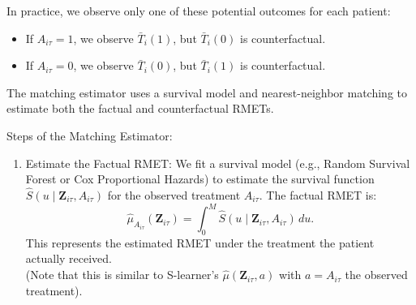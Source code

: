 In practice, we observe only one of these potential outcomes for each patient:
\begin{itemize}
    \item If $ A_{i\tau} = 1 $, we observe $ \bar{T}_i(1) $, but $ \bar{T}_i(0) $ is counterfactual.
    \item If $ A_{i\tau} = 0 $, we observe $ \bar{T}_i(0) $, but $ \bar{T}_i(1) $ is counterfactual.
\end{itemize}

The matching estimator uses a survival model and nearest-neighbor matching to estimate both the factual and counterfactual RMETs.

Steps of the Matching Estimator:
\begin{enumerate}
\item Estimate the Factual RMET:
   We fit a survival model (e.g., Random Survival Forest or Cox Proportional Hazards) to estimate the survival function $ \widehat{S}(u \mid \mathbf{Z}_{i\tau}, A_{i\tau}) $ for the observed treatment $ A_{i\tau} $.
The factual RMET is:
   $$ \widehat{\mu}_{A_{i\tau}}(\mathbf{Z}_{i\tau}) = \int_{0}^{M} \widehat{S}(u \mid \mathbf{Z}_{i\tau}, A_{i\tau}) \, du. $$
   This represents the estimated RMET under the treatment the patient actually received.\\
(Note that this is similar to S-learner’s $\widehat{\mu}(\mathbf{Z}_{i\tau}, a)$ with $a=A_{i\tau}$ the observed treatment).


\end{enumerate}
